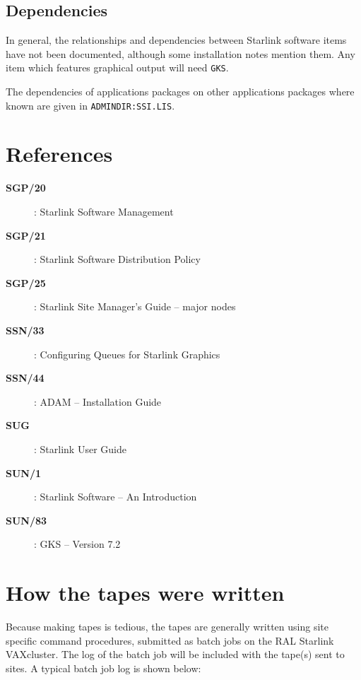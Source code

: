 \subsection {Dependencies}

In general, the relationships and dependencies between Starlink software items
have not been documented, although some installation notes mention them.
Any item which features graphical output will need {\tt GKS}.

The dependencies of applications packages on other applications packages where
known are given in {\tt ADMINDIR\-:SSI.LIS}.

\section {References}
\label{se:references}

\begin{description}
\item[\bf SGP/20]: Starlink Software Management
\item[\bf SGP/21]: Starlink Software Distribution Policy
\item[\bf SGP/25]: Starlink Site Manager's Guide -- major nodes
\item[\bf SSN/33]: Configuring Queues for Starlink Graphics
\item[\bf SSN/44]: ADAM -- Installation Guide
\item[\bf SUG]: Starlink User Guide
\item[\bf SUN/1]: Starlink Software -- An Introduction
\item[\bf SUN/83]: GKS -- Version 7.2
\end{description}

\newpage

\appendix
\section{How the tapes were written}
\label{se:tapes}

Because making tapes is tedious, the tapes are generally written using site
specific command procedures, submitted as batch jobs on the RAL Starlink
VAXcluster. The log of the batch job will be included with the tape(s) sent to
sites. A typical batch job log is shown below:

